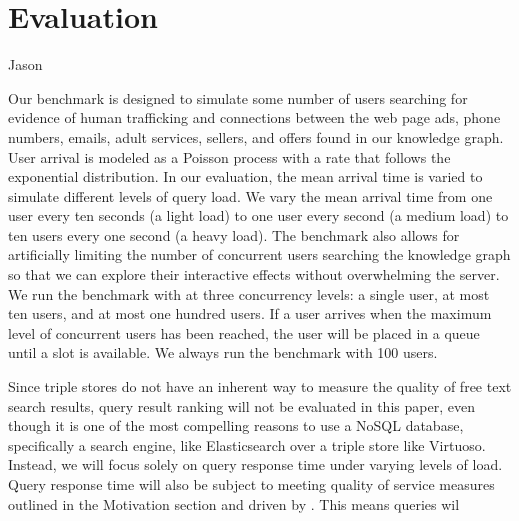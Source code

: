 \section{Evaluation}
\label{sec:evaluation}
Jason



Our benchmark is designed to simulate some number of users searching for evidence of human trafficking and connections between the web page ads, phone numbers, emails, adult services, sellers, and offers found in our knowledge graph.  
User arrival is modeled as a Poisson process with a rate that follows the exponential distribution.  
In our evaluation, the mean arrival time is varied to simulate different levels of query load.  
We vary the mean arrival time from one user every ten seconds (a light load) to one user every second (a medium load) to ten users every one second (a heavy load).
The benchmark also allows for artificially limiting the number of concurrent users searching the knowledge graph so that we can explore their interactive effects without overwhelming the server.  
We run the benchmark with at three concurrency levels: a single user, at most ten users, and at most one hundred users.
If a user arrives when the maximum level of concurrent users has been reached, the user will be placed in a queue until a slot is available.  
We always run the benchmark with 100 users.


Since triple stores do not have an inherent way to measure the quality of free text search results, query result ranking will not be evaluated in this paper, even though it is one of the most compelling reasons to use a NoSQL database, specifically a search engine, like Elasticsearch over a triple store like Virtuoso.
Instead, we will focus solely on query response time under varying levels of load.
Query response time will also be subject to meeting quality of service measures outlined in the Motivation section and driven by \cite{nielsen1994usability}.
This means queries wil



